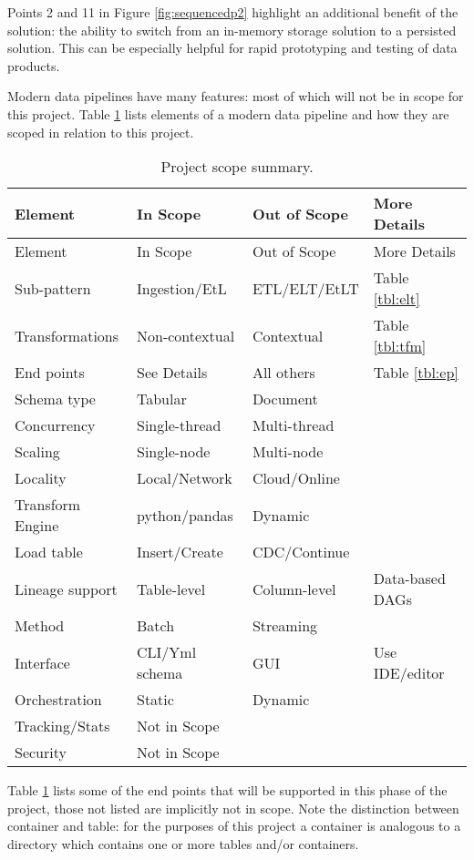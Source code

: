 Points 2 and 11 in Figure \ref{fig:sequencedp2} highlight an additional
benefit of the solution: the ability to switch from an in-memory storage
solution to a persisted solution. This can be especially helpful for
rapid prototyping and testing of data products.

Modern data pipelines have many features: most of which will not be in
scope for this project. Table \ref{tbl:scope} lists elements of a modern
data pipeline and how they are scoped in relation to this project.

\begin{longtable}[]{@{}llll@{}}
\caption{\label{tbl:scope}Project scope summary.}\tabularnewline
\toprule\noalign{}
Element & In Scope & Out of Scope & More Details \\
\midrule\noalign{}
\endfirsthead
\toprule\noalign{}
Element & In Scope & Out of Scope & More Details \\
\midrule\noalign{}
\endhead
\bottomrule\noalign{}
\endlastfoot
Sub-pattern & Ingestion/EtL & ETL/ELT/EtLT & Table \ref{tbl:elt} \\
Transformations & Non-contextual & Contextual & Table \ref{tbl:tfm} \\
End points & See Details & All others & Table \ref{tbl:ep} \\
Schema type & Tabular & Document & \\
Concurrency & Single-thread & Multi-thread & \\
Scaling & Single-node & Multi-node & \\
Locality & Local/Network & Cloud/Online & \\
Transform Engine & python/pandas & Dynamic & \\
Load table & Insert/Create & CDC/Continue & \\
Lineage support & Table-level & Column-level & Data-based DAGs \\
Method & Batch & Streaming & \\
Interface & CLI/Yml schema & GUI & Use IDE/editor \\
Orchestration & Static & Dynamic & \\
Tracking/Stats & Not in Scope & & \\
Security & Not in Scope & & \\
\end{longtable}

Table \ref{tbl:scope} lists some of the end points that will be
supported in this phase of the project, those not listed are implicitly
not in scope. Note the distinction between container and table: for the
purposes of this project a container is analogous to a directory which
contains one or more tables and/or containers.

